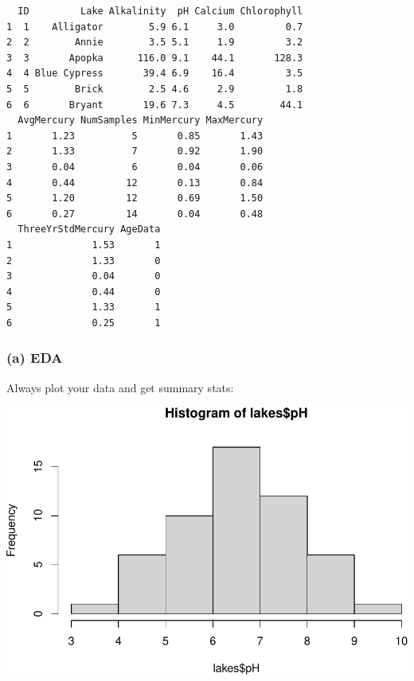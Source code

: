 \documentclass[
]{book}
\newenvironment{Shaded}{\begin{snugshade}}{\end{snugshade}}
\newcommand{\FunctionTok}[1]{\textcolor[rgb]{0.00,0.00,0.00}{#1}}
\newcommand{\NormalTok}[1]{#1}
\newcommand{\SpecialCharTok}[1]{\textcolor[rgb]{0.00,0.00,0.00}{#1}}
\begin{document}
\begin{verbatim}
  ID         Lake Alkalinity  pH Calcium Chlorophyll
1  1    Alligator        5.9 6.1     3.0         0.7
2  2        Annie        3.5 5.1     1.9         3.2
3  3       Apopka      116.0 9.1    44.1       128.3
4  4 Blue Cypress       39.4 6.9    16.4         3.5
5  5        Brick        2.5 4.6     2.9         1.8
6  6       Bryant       19.6 7.3     4.5        44.1
  AvgMercury NumSamples MinMercury MaxMercury
1       1.23          5       0.85       1.43
2       1.33          7       0.92       1.90
3       0.04          6       0.04       0.06
4       0.44         12       0.13       0.84
5       1.20         12       0.69       1.50
6       0.27         14       0.04       0.48
  ThreeYrStdMercury AgeData
1              1.53       1
2              1.33       0
3              0.04       0
4              0.44       0
5              1.33       1
6              0.25       1
\end{verbatim}

\hypertarget{a-eda}{%
\subsubsection{(a) EDA}\label{a-eda}}

Always plot your data and get summary stats:

\begin{Shaded}
\end{Shaded}

\includegraphics[width=1\linewidth]{Class_Activity_19_files/figure-latex/unnamed-chunk-2-1}
\end{document}
